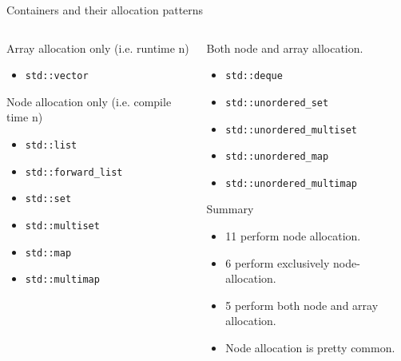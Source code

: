 \documentclass[10pt,aspectratio=169]{beamer}
\begin{document}
\begin{frame}[fragile]{Containers and their allocation patterns}
\begin{columns}
\begin{column}{0.5\textwidth}
Array allocation only (i.e. runtime n)
\begin{itemize}
\item \texttt{std::vector}
\end{itemize}

Node allocation only (i.e. compile time n)
\begin{itemize}
\item \texttt{std::list}
\item \texttt{std::forward\_list}
\item \texttt{std::set}
\item \texttt{std::multiset}
\item \texttt{std::map}
\item \texttt{std::multimap}
\end{itemize}
\end{column}

\begin{column}{0.5\textwidth}
Both node and array allocation.
\begin{itemize}
\item \texttt{std::deque}
\item \texttt{std::unordered\_set}
\item \texttt{std::unordered\_multiset}
\item \texttt{std::unordered\_map}
\item \texttt{std::unordered\_multimap}
\end{itemize}
Summary
\begin{itemize}
\item 11 perform node allocation.
\item 6 perform exclusively node-allocation.
\item 5 perform both node and array allocation.
\item Node allocation is pretty common.
\end{itemize}

\end{column}
\end{columns}
\end{frame}
\end{document}
